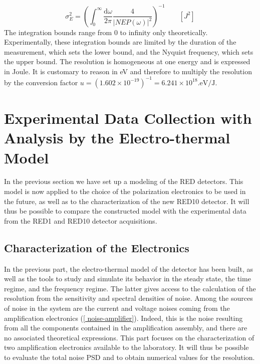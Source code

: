 \begin{equation}
\label{resolution}
\displaystyle{ \sigma_E^2 = \left( \int_{0}^{\infty} \frac{\mathrm{d}\omega}{2\pi}\frac{4}{|NEP(\omega)|^2}\right)^{-1} } \qquad [J^2]
\end{equation}
The integration bounds range from $0$ to infinity only theoretically. Experimentally, these integration bounds are limited by the duration of the measurement, which sets the lower bound, and the Nyquist frequency, which sets the upper bound. The resolution is homogeneous at one energy and is expressed in Joule. It is customary to reason in eV and therefore to multiply the resolution by the conversion factor $u=(1.602\times 10^{-19})^{-1} = 6.241 \times 10^{18}. \textrm{eV/J}$.


\section{Experimental Data Collection with Analysis by the Electro-thermal Model}

In the previous section we have set up a modeling of the RED detectors. This model is now applied to the choice of the polarization electronics to be used in the future, as well as to the characterization of the new RED10 detector. It will thus be possible to compare the constructed model with the experimental data from the RED1 and RED10 detector acquisitions.

\subsection{Characterization of the Electronics}
\label{character}
In the previous part, the electro-thermal model of the detector has been built, as well as the tools to study and simulate its behavior in the steady state, the time regime, and the frequency regime. The latter gives access to the calculation of the resolution from the sensitivity and spectral densities of noise. Among the sources of noise in the system are the current and voltage noises coming from the amplification electronics (\ref{ noise-amplifier}). Indeed, this is the noise resulting from all the components contained in the amplification assembly, and there are no associated theoretical expressions. This part focuses on the characterization of two amplification electronics available to the laboratory. It will thus be possible to evaluate the total noise PSD and to obtain numerical values for the resolution.

